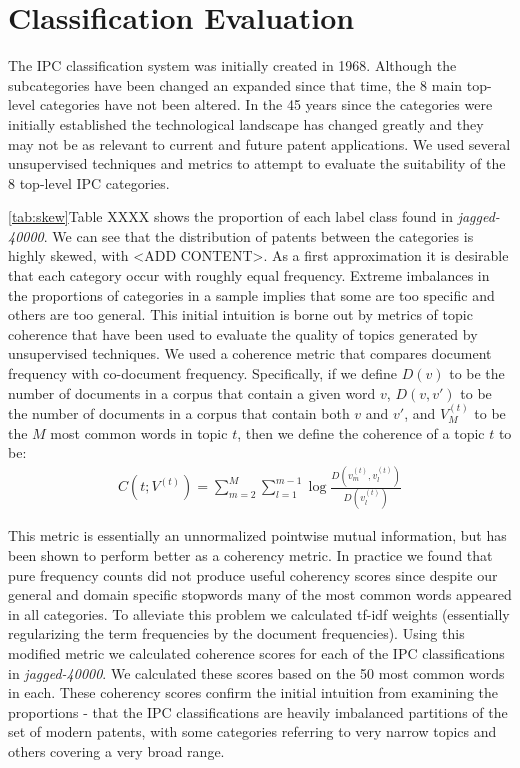 \section{Classification Evaluation} %
\label{sec:classification_evaluation}

The IPC classification system was initially created in 1968. Although the subcategories have been changed an expanded since that time, the 8 main top-level categories have not been altered. In the 45 years since the categories were initially established the technological landscape has changed greatly and they may not be as relevant to current and future patent applications. We used several unsupervised techniques and metrics to attempt to evaluate the suitability of the 8 top-level IPC categories.

\ref{tab:skew}Table XXXX shows the proportion of each label class found in \emph{jagged-40000}. We can see that the distribution of patents between the categories is highly skewed, with <ADD CONTENT>. As a first approximation it is desirable that each category occur with roughly equal frequency. Extreme imbalances in the proportions of categories in a sample implies that some are too specific and others are too general. This initial intuition is borne out by metrics of topic coherence that have been used to evaluate the quality of topics generated by unsupervised techniques. We used a coherence metric that compares document frequency with co-document frequency\cite{Mimno_optimizingsemantic}. Specifically, if we define $D(v)$ to be the number of documents in a corpus that contain a given word $v$, $D(v, v')$ to be the number of documents in a corpus that contain both $v$ and $v'$, and $V^{(t)}_M$ to be the $M$ most common words in topic $t$, then we define the coherence of a topic $t$ to be:
\begin{align*}
	C(t;V^{(t)}) = \sum_{m=2}^M \sum_{l=1}^{m-1} \log \frac{D(v^{(t)}_m, v^{(t)}_l)}{D(v^{(t)}_l)}
\end{align*}

This metric is essentially an unnormalized pointwise mutual information, but has been shown to perform better as a coherency metric\cite{Mimno_optimizingsemantic}. In practice we found that pure frequency counts did not produce useful coherency scores since despite our general and domain specific stopwords many of the most common words appeared in all categories. To alleviate this problem we calculated tf-idf weights (essentially regularizing the term frequencies by the document frequencies). Using this modified metric we calculated coherence scores for each of the IPC classifications in \emph{jagged-40000}. We calculated these scores based on the 50 most common words in each. These coherency scores confirm the initial intuition from examining the proportions - that the IPC classifications are heavily imbalanced partitions of the set of modern patents, with some categories referring to very narrow topics and others covering a very broad range.

